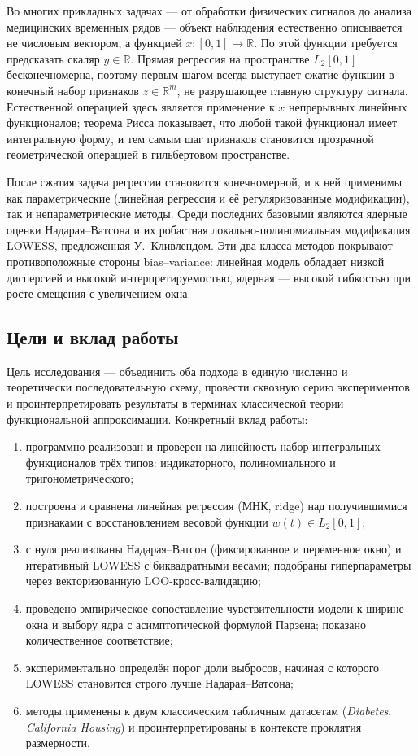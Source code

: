 \documentclass[12pt,a4paper]{article}
\theoremstyle{definition}
\theoremstyle{remark}
\newcommand{\R}{\mathbb{R}}
\newcommand{\Ltwo}{L_{2}[0,1]}
\begin{document}
Во многих прикладных задачах --- от обработки физических сигналов до анализа
медицинских временных рядов --- объект наблюдения естественно описывается не
числовым вектором, а функцией $x\colon[0,1]\to\R$. По этой функции требуется
предсказать скаляр $y\in\R$. Прямая регрессия на пространстве $\Ltwo$
бесконечномерна, поэтому первым шагом всегда выступает сжатие функции в
конечный набор признаков $z\in\R^{m}$, не разрушающее главную структуру
сигнала. Естественной операцией здесь является применение к $x$ непрерывных
линейных функционалов; теорема Рисса показывает, что любой такой функционал
имеет интегральную форму, и тем самым шаг признаков становится прозрачной
геометрической операцией в гильбертовом пространстве.

После сжатия задача регрессии становится конечномерной, и к ней применимы как
параметрические (линейная регрессия и её регуляризованные модификации), так
и непараметрические методы. Среди последних базовыми являются ядерные оценки
Надарая--Ватсона и их робастная локально-полиномиальная модификация LOWESS,
предложенная У.~Кливлендом. Эти два класса методов покрывают противоположные
стороны bias--variance: линейная модель обладает низкой дисперсией и высокой
интерпретируемостью, ядерная --- высокой гибкостью при росте смещения с
увеличением окна.

\subsection{Цели и вклад работы}

Цель исследования --- объединить оба подхода в единую численно и теоретически
последовательную схему, провести сквозную серию экспериментов и
проинтерпретировать результаты в терминах классической теории функциональной
аппроксимации. Конкретный вклад работы:
\begin{enumerate}[leftmargin=*,itemsep=2pt,topsep=2pt]
    \item программно реализован и проверен на линейность набор интегральных
        функционалов трёх типов: индикаторного, полиномиального и
        тригонометрического;
    \item построена и сравнена линейная регрессия (МНК, ridge) над
        получившимися признаками с восстановлением весовой функции
        $w(t)\in\Ltwo$;
    \item с нуля реализованы Надарая--Ватсон (фиксированное и переменное окно)
        и итеративный LOWESS с биквадратными весами; подобраны гиперпараметры
        через векторизованную LOO-кросс-валидацию;
    \item проведено эмпирическое сопоставление чувствительности модели к
        ширине окна и выбору ядра с асимптотической формулой Парзена; показано
        количественное соответствие;
    \item экспериментально определён порог доли выбросов, начиная с которого
        LOWESS становится строго лучше Надарая--Ватсона;
    \item методы применены к двум классическим табличным датасетам
        (\textit{Diabetes}, \textit{California Housing}) и проинтерпретированы
        в контексте проклятия размерности.
\end{enumerate}
\end{document}
